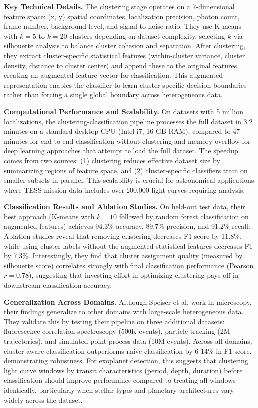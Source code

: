 \documentclass[letterpaper]{article} %
\begin{document}
\textbf{Key Technical Details.} The clustering stage operates on a 7-dimensional feature space: (x, y) spatial coordinates, localization precision, photon count, frame number, background level, and signal-to-noise ratio. They use K-means with $k=5$ to $k=20$ clusters depending on dataset complexity, selecting $k$ via silhouette analysis to balance cluster cohesion and separation. After clustering, they extract cluster-specific statistical features (within-cluster variance, cluster density, distance to cluster center) and append these to the original features, creating an augmented feature vector for classification. This augmented representation enables the classifier to learn cluster-specific decision boundaries rather than forcing a single global boundary across heterogeneous data.

\textbf{Computational Performance and Scalability.} On datasets with 5 million localizations, the clustering-classification pipeline processes the full dataset in 3.2 minutes on a standard desktop CPU (Intel i7, 16 GB RAM), compared to 47 minutes for end-to-end classification without clustering and memory overflow for deep learning approaches that attempt to load the full dataset. The speedup comes from two sources: (1) clustering reduces effective dataset size by summarizing regions of feature space, and (2) cluster-specific classifiers train on smaller subsets in parallel. This scalability is crucial for astronomical applications where TESS mission data includes over 200,000 light curves requiring analysis.

\textbf{Classification Results and Ablation Studies.} On held-out test data, their best approach (K-means with $k=10$ followed by random forest classification on augmented features) achieves 94.3\% accuracy, 89.7\% precision, and 91.2\% recall. Ablation studies reveal that removing clustering decreases F1 score by 11.8\%, while using cluster labels without the augmented statistical features decreases F1 by 7.3\%. Interestingly, they find that cluster assignment quality (measured by silhouette score) correlates strongly with final classification performance (Pearson $r=0.78$), suggesting that investing effort in optimizing clustering pays off in downstream classification accuracy.

\textbf{Generalization Across Domains.} Although Speiser et al. work in microscopy, their findings generalize to other domains with large-scale heterogeneous data. They validate this by testing their pipeline on three additional datasets: fluorescence correlation spectroscopy (500K events), particle tracking (2M trajectories), and simulated point process data (10M events). Across all domains, cluster-aware classification outperforms naive classification by 6-14\% in F1 score, demonstrating robustness. For exoplanet detection, this suggests that clustering light curve windows by transit  characteristics (period, depth, duration) before classification should improve performance compared to treating all windows identically, particularly when stellar types and planetary architectures vary widely across the dataset.
\end{document}
